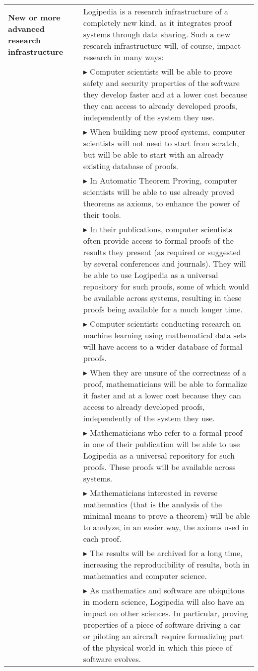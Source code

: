 \begin{longtable}{|p{}|p{}|}
\hline
{\bf New or more advanced research infrastructure}
&
Logipedia is a research
infrastructure of a completely new kind, as it integrates proof systems
through data sharing. Such a new research infrastructure will, of
course, impact research in many ways:\\
&
$\blacktriangleright$ Computer scientists
will be able to prove safety and security
  properties of the software they develop faster and at a lower cost
  because they can access to already developed proofs, independently
  of the system they use.
\\
&
$\blacktriangleright$ When building new proof systems, computer scientists will not
  need to start from scratch, but will be able to start with an already
  existing database of proofs.
\\
&
$\blacktriangleright$ In Automatic Theorem Proving, computer scientists will be able
  to use already proved theorems as axioms, to enhance the power of
  their tools.
\\
&
$\blacktriangleright$ In their publications, computer scientists often provide access
  to formal proofs of the results they present (as required or
  suggested by several conferences and journals). They will be able to
  use Logipedia as a universal repository for such proofs, some of
  which would be available across systems, resulting in these proofs being
  available for a much longer time.
\\
&
$\blacktriangleright$ Computer scientists conducting research on machine learning
  using mathematical data sets will have access to a wider database of formal proofs.
\\
&
$\blacktriangleright$ When they are unsure of the correctness of a proof,
  mathematicians will be able to formalize it faster and at a lower
  cost because they can access to already developed proofs,
  independently of the system they use.
\\
&
$\blacktriangleright$ Mathematicians who refer to a formal proof in one of
their
  publication will be able to use Logipedia as a universal
  repository for such proofs. These proofs will be available across
  systems.
\\
&
$\blacktriangleright$
Mathematicians interested in reverse mathematics (that is the analysis
of the minimal means to prove a theorem) will be able to analyze, in
an easier way, the axioms used in each proof.
\\
&
$\blacktriangleright$ The results will be archived for a long time, increasing the
  reproducibility of results, both in mathematics and computer science.
\\
&
$\blacktriangleright$ As mathematics and software are ubiquitous in modern science,
  Logipedia will also have an impact on other sciences. In
  particular, proving properties of a piece of software driving
  a car or piloting an aircraft require formalizing part of the
  physical world in which this piece of software evolves.
\\


\end{longtable}
